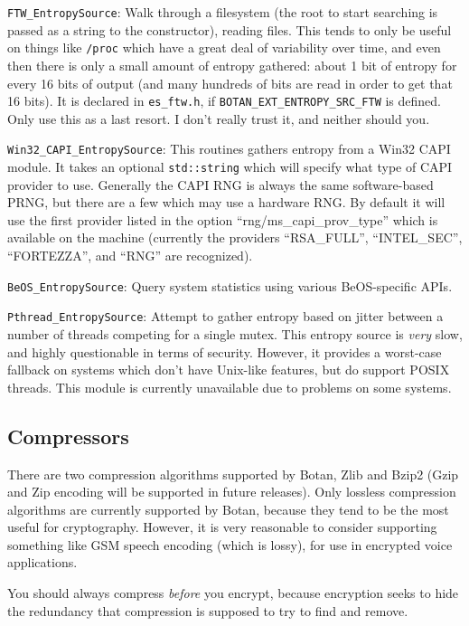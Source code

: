 \documentclass{article}
\newcommand{\filename}[1]{\texttt{#1}}
\newcommand{\macro}[1]{\texttt{#1}}
\newcommand{\type}[1]{\texttt{#1}}
\begin{document}
\noindent
\type{FTW\_EntropySource}: Walk through a filesystem (the root to start
searching is passed as a string to the constructor), reading files. This tends
to only be useful on things like \filename{/proc} which have a great deal of
variability over time, and even then there is only a small amount of entropy
gathered: about 1 bit of entropy for every 16 bits of output (and many hundreds
of bits are read in order to get that 16 bits). It is declared in
\filename{es\_ftw.h}, if \macro{BOTAN\_EXT\_ENTROPY\_SRC\_FTW} is defined. Only
use this as a last resort. I don't really trust it, and neither should you.

\noindent
\type{Win32\_CAPI\_EntropySource}: This routines gathers entropy from a Win32
CAPI module. It takes an optional \type{std::string} which will specify what
type of CAPI provider to use. Generally the CAPI RNG is always the same
software-based PRNG, but there are a few which may use a hardware RNG. By
default it will use the first provider listed in the option
``rng/ms\_capi\_prov\_type'' which is available on the machine (currently the
providers ``RSA\_FULL'', ``INTEL\_SEC'', ``FORTEZZA'', and ``RNG'' are
recognized).

\noindent
\type{BeOS\_EntropySource}: Query system statistics using various BeOS-specific
APIs.

\noindent
\type{Pthread\_EntropySource}: Attempt to gather entropy based on jitter
between a number of threads competing for a single mutex. This entropy source
is \emph{very} slow, and highly questionable in terms of security. However, it
provides a worst-case fallback on systems which don't have Unix-like features,
but do support POSIX threads. This module is currently unavailable due to
problems on some systems.

\subsection{Compressors}

There are two compression algorithms supported by Botan, Zlib and Bzip2 (Gzip
and Zip encoding will be supported in future releases). Only lossless
compression algorithms are currently supported by Botan, because they tend to
be the most useful for cryptography. However, it is very reasonable to consider
supporting something like GSM speech encoding (which is lossy), for use in
encrypted voice applications.

You should always compress \emph{before} you encrypt, because encryption seeks
to hide the redundancy that compression is supposed to try to find and remove.
\end{document}
